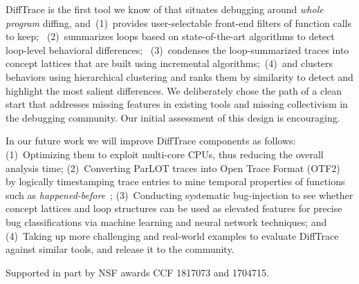 DiffTrace is the first tool we know of that situates debugging around {\em whole program}
diffing, and~(1)~provides user-selectable front-end filters of function calls to keep;
~(2)~summarizes loops based on state-of-the-art algorithms to detect loop-level
behavioral differences;
~(3)~condenses the loop-summarized
traces into concept lattices that are built using incremental
algorithms;~(4)~and clusters behaviors using hierarchical clustering and ranks them by similarity to detect and highlight the most salient differences.
We deliberately chose the path of a clean start that addresses missing features
in existing tools and missing collectivism in the debugging community.
%
Our initial assessment of this design is encouraging.
%

In our future work we will improve DiffTrace components as follows:
%
%
(1)~Optimizing them to exploit multi-core CPUs, thus reducing the overall analysis time;
%
(2)~Converting ParLOT traces into Open Trace Format (OTF2)~\cite{otf2} by logically timestamping trace entries to mine temporal properties of functions such as \textit{happened-before}~\cite{lamport};
%
(3)~Conducting systematic bug-injection to see whether concept lattices and loop structures can be used as elevated features for precise bug classifications via machine learning and neural network techniques; and
%
(4)~Taking up more challenging and real-world examples to evaluate DiffTrace against similar tools, and release it to the community.

 Supported in part by 
NSF awards CCF 1817073 and 1704715.


